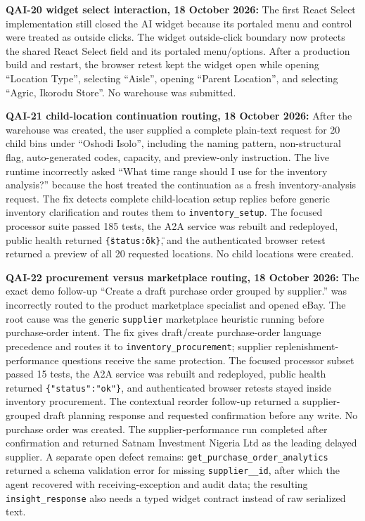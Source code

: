 \documentclass[10pt]{article}
\begin{document}
\colorbox{mist}{\parbox{0.96\textwidth}{\textbf{QAI-20 widget select interaction, 18 October 2026:} The first React Select implementation still closed the AI widget because its portaled menu and control were treated as outside clicks. The widget outside-click boundary now protects the shared React Select field and its portaled menu/options. After a production build and restart, the browser retest kept the widget open while opening ``Location Type'', selecting ``Aisle'', opening ``Parent Location'', and selecting ``Agric, Ikorodu Store''. No warehouse was submitted.}}

\colorbox{mist}{\parbox{0.96\textwidth}{\textbf{QAI-21 child-location continuation routing, 18 October 2026:} After the warehouse was created, the user supplied a complete plain-text request for 20 child bins under ``Oshodi Isolo'', including the naming pattern, non-structural flag, auto-generated codes, capacity, and preview-only instruction. The live runtime incorrectly asked ``What time range should I use for the inventory analysis?'' because the host treated the continuation as a fresh inventory-analysis request. The fix detects complete child-location setup replies before generic inventory clarification and routes them to \texttt{inventory\_setup}. The focused processor suite passed 185 tests, the A2A service was rebuilt and redeployed, public health returned \texttt{\{\"status\":\"ok\"\}}, and the authenticated browser retest returned a preview of all 20 requested locations. No child locations were created.}}

\colorbox{mist}{\parbox{0.96\textwidth}{\textbf{QAI-22 procurement versus marketplace routing, 18 October 2026:} The exact demo follow-up ``Create a draft purchase order grouped by supplier.'' was incorrectly routed to the product marketplace specialist and opened eBay. The root cause was the generic \texttt{supplier} marketplace heuristic running before purchase-order intent. The fix gives draft/create purchase-order language precedence and routes it to \texttt{inventory\_procurement}; supplier replenishment-performance questions receive the same protection. The focused processor subset passed 15 tests, the A2A service was rebuilt and redeployed, public health returned \texttt{\{"status":"ok"\}}, and authenticated browser retests stayed inside inventory procurement. The contextual reorder follow-up returned a supplier-grouped draft planning response and requested confirmation before any write. No purchase order was created. The supplier-performance run completed after confirmation and returned Satnam Investment Nigeria Ltd as the leading delayed supplier. A separate open defect remains: \texttt{get\_purchase\_order\_analytics} returned a schema validation error for missing \texttt{supplier\_\_id}, after which the agent recovered with receiving-exception and audit data; the resulting \texttt{insight\_response} also needs a typed widget contract instead of raw serialized text.}}
\end{document}
